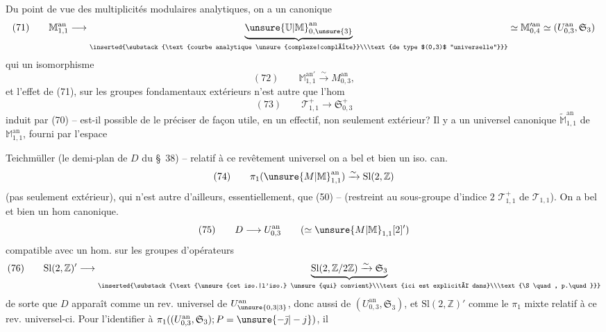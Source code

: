 Du point de vue des multiplicités modulaires analytiques, on a un  canonique
\[
(71)\qquad \mathbb M^{\mathrm{an}}_{1,1}\longrightarrow
\underbrace{\unsure{\mathbb U|\mathbb M}^{\mathrm{an}}_{0,\unsure{3}}}_{\inserted{\substack{\text{courbe analytique \unsure{complexe|complète}}\\\text{de type $(0,3)$ ``universelle''}}}}
\simeq \mathbb M^{\prime\mathrm{an}}_{0,4}\simeq(U^{\mathrm{an}}_{0,3},\mathfrak S_3)
\]
 qui  un isomorphisme
\[
(72)\qquad \mathbb M^{\mathrm{an}\prime}_{1,1}\xrightarrow{\sim} M^{\mathrm{an}}_{0,3},
\]
et l'effet de (71), sur les groupes fondamentaux extérieurs n'est autre que l'hom 
\[
(73)\qquad \mathcal T^+_{1,1}\longrightarrow\mathfrak S^+_{0,3}
\]
induit par (70) -- est-il possible de le préciser de façon utile, en un  effectif, non seulement extérieur? Il y a un  universel canonique $\widetilde{\mathbb M}^{\mathrm{an}}_{1,1}$ de $\mathbb M^{\mathrm{an}}_{1,1}$, fourni par l'espace 


Teichmüller (le demi-plan de  $D$ du \S\ 38) -- relatif à ce revêtement universel on a bel et bien un iso. can.
\[
(74)\qquad \pi_1(\unsure{M|\mathbb M}^{\mathrm{an}}_{1,1})\xrightarrow{\sim}\mathrm{Sl}(2,\mathbb Z)
\]
(pas seulement extérieur), qui n'est autre d'ailleurs, essentiellement, que (50) -- (restreint au sous-groupe d'indice $2$ $\mathcal T^+_{1,1}$ de $\mathcal T_{1,1}$). On a bel et bien un hom canonique.
\[
(75)\qquad D\longrightarrow U^{\mathrm{an}}_{0,3}\qquad(\simeq \unsure{M|\mathbb M}_{1,1}[2]')
\]
compatible avec un hom. sur les groupes d'opérateurs
\[
(76)\qquad \mathrm{Sl}(2,\mathbb Z)'\longrightarrow
\underbrace{\mathrm{Sl}(2,\mathbb Z/2\mathbb Z)\xrightarrow{\sim}\mathfrak S_3}_{\inserted{\substack{\text{\unsure{cet iso.|l'iso.} \unsure{qui} convient}\\\text{ici est explicité dans}\\\text{\S\quad, p.\quad}}}}
\]
de sorte que $D$ apparaît comme un rev. universel de $U^{\mathrm{an}}_{\unsure{0,3|3}}$, donc aussi de $(U^{\mathrm{an}}_{0,3},\mathfrak S_3)$, et $\mathrm{Sl}(2,\mathbb Z)'$ comme le $\pi_1$ mixte relatif à ce rev. universel-ci. Pour  l'identifier à $\pi_1((U^{\mathrm{an}}_{0,3},\mathfrak S_3);P=\unsure{-\bar{\jmath}|-j})$, il
